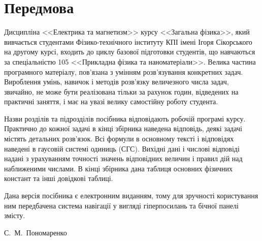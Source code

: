 
\chapter*{Передмова}

Дисципліна <<Електрика та магнетизм>> курсу <<Загальна фізика>>, який вивчається студентами Фізико-технічного інституту КПІ імені Ігоря Сікорського на другому курсі, входить до циклу базової підготовки студентів, що навчаються за спеціальністю 105 <<Прикладна фізика та наноматеріали>>. Велика частина програмного матеріалу, пов'язана з умінням розв'язування конкретних задач. Вироблення умінь, навичок і методів розв'язку величезного числа задач, звичайно, не може бути реалізована тільки за рахунок годин, відведених на практичні заняття, і має на увазі велику самостійну роботу студента.

Назви розділів та підрозділів посібника відповідають робочій програмі курсу. Практично до кожної задачі  в кінці збірника наведена відповідь, деякі задачі містять детальних розв'язок. Всі формули в основному тексті і відповідях наведені в гаусовій системі одиниць (СГС). Вихідні дані і числові відповіді надані з урахуванням точності значень відповідних величин і правил дій над наближеними числами. В кінці збірника дана таблиця основних фізичних констант та інші довідкові таблиці.

Дана версія посібника є електронним виданням, тому для зручності користування ним передбачена система навігації у вигляді гіперпосилань та бічної панелі змісту.

\vspace*{4em}

\begin{flushright}
	С.~М.~Пономаренко
\end{flushright}







